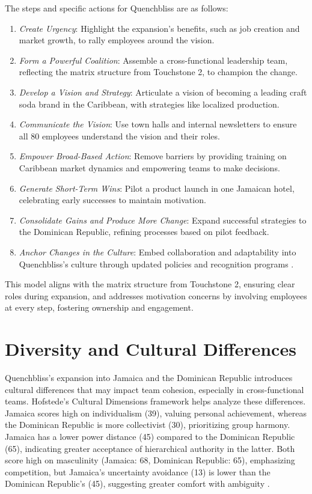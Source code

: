 \documentclass[12pt]{article}
\begin{document}
The steps and specific actions for Quenchbliss are as follows:
\begin{enumerate}
    \item \textit{Create Urgency}: Highlight the expansion’s benefits, such as job creation and market growth, to rally employees around the vision.
    \item \textit{Form a Powerful Coalition}: Assemble a cross-functional leadership team, reflecting the matrix structure from Touchstone 2, to champion the change.
    \item \textit{Develop a Vision and Strategy}: Articulate a vision of becoming a leading craft soda brand in the Caribbean, with strategies like localized production.
    \item \textit{Communicate the Vision}: Use town halls and internal newsletters to ensure all 80 employees understand the vision and their roles.
    \item \textit{Empower Broad-Based Action}: Remove barriers by providing training on Caribbean market dynamics and empowering teams to make decisions.
    \item \textit{Generate Short-Term Wins}: Pilot a product launch in one Jamaican hotel, celebrating early successes to maintain motivation.
    \item \textit{Consolidate Gains and Produce More Change}: Expand successful strategies to the Dominican Republic, refining processes based on pilot feedback.
    \item \textit{Anchor Changes in the Culture}: Embed collaboration and adaptability into Quenchbliss’s culture through updated policies and recognition programs \citep{sophia_change}.
\end{enumerate}

This model aligns with the matrix structure from Touchstone 2, ensuring clear roles during expansion, and addresses motivation concerns by involving employees at every step, fostering ownership and engagement.

\section{Diversity and Cultural Differences}
Quenchbliss’s expansion into Jamaica and the Dominican Republic introduces cultural differences that may impact team cohesion, especially in cross-functional teams. Hofstede’s Cultural Dimensions framework helps analyze these differences. Jamaica scores high on individualism (39), valuing personal achievement, whereas the Dominican Republic is more collectivist (30), prioritizing group harmony. Jamaica has a lower power distance (45) compared to the Dominican Republic (65), indicating greater acceptance of hierarchical authority in the latter. Both score high on masculinity (Jamaica: 68, Dominican Republic: 65), emphasizing competition, but Jamaica’s uncertainty avoidance (13) is lower than the Dominican Republic’s (45), suggesting greater comfort with ambiguity \citep{sophia_culture}.
\end{document}
